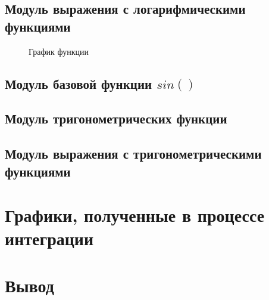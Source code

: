 \documentclass[a4paper,10pt]{article}
\begin{document}
    \subsection*{Модуль выражения с логарифмическими функциями}
		
		\begin{figure}[h!]
			\caption{График функции}
		\end{figure}
	

    \subsection*{Модуль базовой функции $sin()$}
    \subsection*{Модуль тригонометрических функции} 
    \subsection*{Модуль выражения с тригонометрическими функциями}
    
\section*{Графики, полученные в процессе интеграции}
\section*{Вывод}
\end{document}
